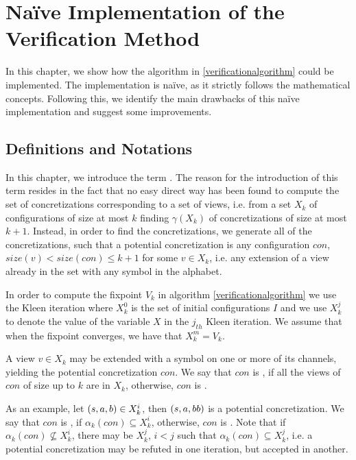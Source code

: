 \section{Naïve Implementation of the Verification Method}
\label{naive}
In this chapter, we show how the algorithm in \ref{verificationalgorithm} could be implemented. The implementation is naïve, as it strictly follows the mathematical concepts. Following this, we identify the main drawbacks of this naïve implementation and suggest some improvements.

\subsection{Definitions and Notations}
In this chapter, we introduce the term . The reason for the introduction of this term resides in the fact that no easy direct way has been found to compute the set of concretizations corresponding to a set of views, i.e. from a set $X_k$ of configurations of size at most $k$ finding $\gamma(X_k)$ of concretizations of size at most $k+1$. Instead, in order to find the concretizations, we generate all of the  concretizations, such that a potential concretization is any configuration $con$, $size(v) < size(con) \leq k+1$ for some $v \in X_k$, i.e. any extension of a view already in the set with any symbol in the alphabet.

In order to compute the fixpoint $V_k$ in algorithm \ref{verificationalgorithm} we use the Kleen iteration where $X_k^0$ is the set of initial configurations $I$ and we use $X_k^j$ to denote the value of the variable $X$ in the $j_{th}$ Kleen iteration. We assume that when the fixpoint converges, we have that $X_k^m=V_k$.

 
A view $v\in X_k$ may be extended with a symbol on one or more of its channels, yielding the potential concretization $con$. We say that $con$ is , if all the views of $con$ of size up to $k$ are in $X_k$, otherwise, $con$ is . 

As an example, let $(s, a, b) \in X_k^i$, then $(s, a, bb)$ is a potential concretization. We say that $con$ is , if $\alpha_k(con) \subseteq X_k^i$, otherwise, $con$ is . Note that if $\alpha_k(con) \not\subseteq X_k^i$, there may be $X_k^j$, $i < j$ such that $\alpha_k(con) \subseteq X_k^j$, i.e. a potential concretization may be refuted in one iteration, but accepted in another.

